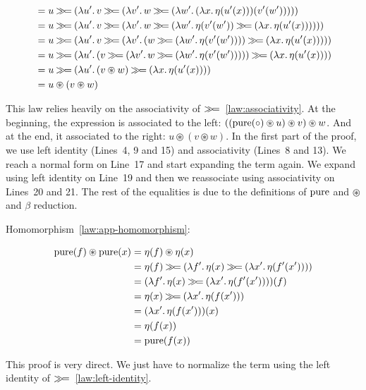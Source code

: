 \begin{align}
  &= u \hsbind (\lam{u'}{v \hsbind (\lam{v'}{w \hsbind (\lam{w'}{(\lam{x}{\eta(u'(x))})(v'(w'))})})}) \\
  &= u \hsbind (\lam{u'}{v \hsbind (\lam{v'}{w \hsbind (\lam{w'}{\eta(v'(w')) \hsbind (\lam{x}{\eta(u'(x))})})})}) \\
  &= u \hsbind (\lam{u'}{v \hsbind (\lam{v'}{(w \hsbind (\lam{w'}{\eta(v'(w'))})) \hsbind (\lam{x}{\eta(u'(x))})})}) \\
  &= u \hsbind (\lam{u'}{(v \hsbind (\lam{v'}{w \hsbind (\lam{w'}{\eta(v'(w'))})})) \hsbind (\lam{x}{\eta(u'(x))})}) \\
  &= u \hsbind (\lam{u'}{(v \circledast w) \hsbind (\lam{x}{\eta(u'(x))})}) \\
  &= u \circledast (v \circledast w)
\end{align}
\setcounter{equation}{\value{TemporaryCounter}}
\ChapterPrefix

This law relies heavily on the associativity of
$\mathbin{\gg\!=}$~\eqref{law:associativity}. At the beginning, the expression is
associated to the left:
$((\operatorname{pure}(\circ) \circledast u) \circledast v) \circledast w$. And at the
end, it associated to the right: $u \circledast (v \circledast w)$. In the
first part of the proof, we use left identity (Lines~4, 9 and 15) and
associativity (Lines~8 and 13). We reach a normal form on Line~17 and start
expanding the term again. We expand using left identity on Line~19 and then
we reassociate using associativity on Lines~20 and 21. The rest of the
equalities is due to the definitions of $\operatorname{pure}$ and $\circledast$ and
$\beta$ reduction.

Homomorphism~\eqref{law:app-homomorphism}:

\setcounter{TemporaryCounter}{\value{equation}}
\setcounter{equation}{0}
\NoChapterPrefix
\begin{align}
\operatorname{pure}(f) \circledast \operatorname{pure}(x)
&= \eta(f) \circledast \eta(x) \\
&= \eta(f) \mathbin{\gg\!=} (\lambda f'.\, \eta(x) \mathbin{\gg\!=} (\lambda x'.\, \eta(f'(x')))) \\
&= (\lambda f'.\, \eta(x) \mathbin{\gg\!=} (\lambda x'.\, \eta(f'(x'))))(f) \\
&= \eta(x) \mathbin{\gg\!=} (\lambda x'.\, \eta(f(x'))) \\
&= (\lambda x'.\, \eta(f(x')))(x) \\
&= \eta(f(x)) \\
&= \operatorname{pure}(f(x))
\end{align}
\setcounter{equation}{\value{TemporaryCounter}}
\ChapterPrefix

This proof is very direct. We just have to normalize the term using the
left identity of $\mathbin{\gg\!=}$~\eqref{law:left-identity}.

